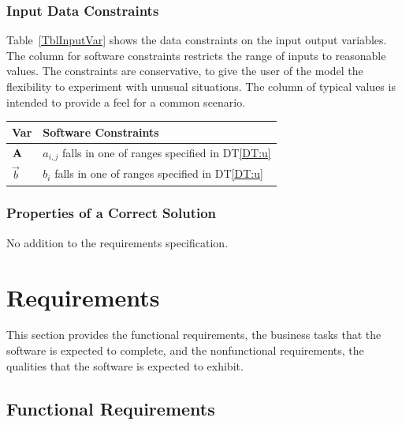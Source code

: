 \documentclass[12pt]{article}
\newcommand{\dtref}[1]{DT\ref{#1}}
\begin{document}

\subsubsection{Input Data Constraints} \label{sec_DataConstraints}

Table~\ref{TblInputVar} shows the data constraints on the input output variables.
The column for software constraints restricts the range of inputs to reasonable
values. The constraints are conservative, to give the user of the model the
flexibility to experiment with unusual situations. The column of typical values
is intended to provide a feel for a common scenario.

\begin{table}[!h]
  \caption{Input Variables} \label{TblInputVar}
  \renewcommand{\arraystretch}{1.2}
  \noindent
  \begin{longtable*}{ll}
    \toprule
    \textbf{Var} & \textbf{Software Constraints} \\
    \midrule
    \(\mathbf{A}\)     &  \(a_{i,j}\) falls in one of ranges specified in \dtref{DT:u} \\
    \(\vec{b}\)            &  \(b_{i}\) falls in one of ranges specified in \dtref{DT:u} \\
    \bottomrule
\end{longtable*}
\end{table}

\subsubsection{Properties of a Correct Solution} \label{sec_CorrectSolution}

\noindent No addition to the requirements specification.

\section{Requirements}


This section provides the functional requirements, the business tasks that the
software is expected to complete, and the nonfunctional requirements, the
qualities that the software is expected to exhibit.

\subsection{Functional Requirements}
\end{document}
